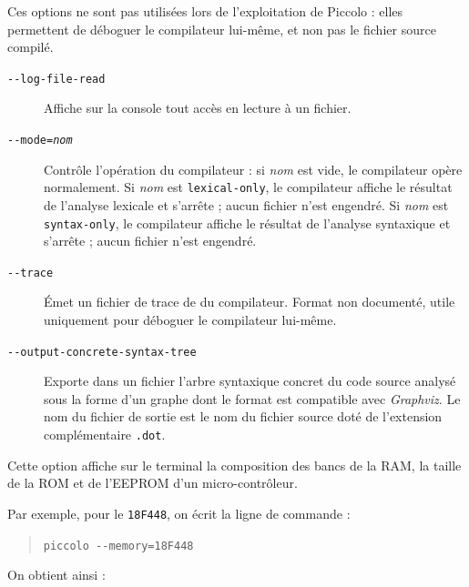 Ces options ne sont pas utilisées lors de l'exploitation de Piccolo : elles permettent de déboguer le compilateur lui-même, et non pas le fichier source compilé.

\begin{description}

  \item[\texttt{-{-}log-file-read}] Affiche sur la console tout accès en lecture à un fichier.


  \item[\texttt{-{-}mode=\emph{nom}}] Contrôle l'opération du compilateur : si \emph{nom} est vide, le compilateur opère normalement. Si \emph{nom} est \texttt{lexical-only}, le compilateur affiche le résultat de l'analyse lexicale et s'arrête ; aucun fichier n'est engendré. Si \emph{nom} est \texttt{syntax-only}, le compilateur affiche le résultat de l'analyse syntaxique et s'arrête ; aucun fichier n'est engendré.



  \item[\texttt{-{-}trace}] Émet un fichier de trace de du compilateur. Format non documenté, utile uniquement pour déboguer le compilateur lui-même.


  \item[\texttt{-{-}output-concrete-syntax-tree}] Exporte dans un fichier l'arbre syntaxique concret du code source analysé sous la forme d'un graphe dont le format est compatible avec \emph{Graphviz}. Le nom du fichier de sortie est le nom du fichier source doté de l'extension complémentaire \texttt{.dot}.

\end{description}










Cette option affiche sur le terminal la composition des bancs de la RAM, la taille de la ROM et de l’EEPROM d'un micro-contrôleur.

Par exemple, pour le \texttt{18F448}, on écrit la ligne de commande :
\begin{quote}
  \texttt{piccolo -{}-memory=18F448}
\end{quote}

On obtient ainsi : 



